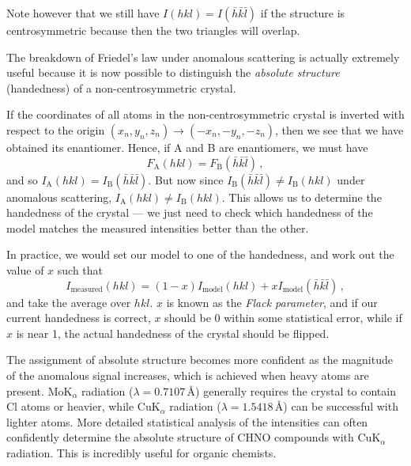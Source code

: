 \documentclass{article}
\theoremstyle{plain}\theoremheaderfont{\normalfont\itshape}\theorembodyfont{\rmfamily}\theoremseparator{.}\newtheorem*{rem}{Remark}\newtheorem*{ex}{Example}\newtheorem*{proof}{Proof}\newtheorem*{altp}{Alternative proof}
\theoremstyle{plain}\theoremheaderfont{\normalfont\bfseries}\theorembodyfont{\rmfamily}\theoremseparator{.}\newtheorem{thm}{Theorem}[section]\newtheorem{lem}[thm]{Lemma}\newtheorem{prop}[thm]{Proposition}\newtheorem*{cor}{Corollary}\newtheorem{defn}[thm]{Definition}\newtheorem{clm}[thm]{Claim}\newtheorem{clminproof}{Claim}\newtheorem*{law}{Law}\newtheorem{pos}[thm]{Postulate}
\theoremstyle{break}\theoremheaderfont{\normalfont\itshape}\theorembodyfont{\rmfamily}\theoremseparator{.\medskip}\newtheorem*{proofskip}{Proof}\newtheorem*{exs}{Examples}\newtheorem*{rems}{Remarks}
\theoremstyle{break}\theoremheaderfont{\normalfont\bfseries}\theorembodyfont{\rmfamily}\theoremseparator{.\medskip}\newtheorem{lemskip}[thm]{Lemma}\newtheorem{defnskip}[thm]{Definition}\newtheorem{propskip}[thm]{Proposition}\newtheorem{thmskip}[thm]{Theorem}
\numberwithin{equation}{section}
\begin{document}
    Note however that we still have \(I(hkl)=I(\bar{h}\bar{k}\bar{l})\) if the structure is centrosymmetric because then the two triangles will overlap.

    The breakdown of Friedel's law under anomalous scattering is actually extremely useful because it is now possible to distinguish the \textit{absolute structure} (handedness) of a non-centrosymmetric crystal.

    If the coordinates of all atoms in the non-centrosymmetric crystal is inverted with respect to the origin \((x_n,y_n,z_n)\to(-x_n,-y_n,-z_n)\), then we see that we have obtained its enantiomer. Hence, if A and B are enantiomers, we must have
    \begin{equation}
        F_{\text{A}}(hkl)=F_{\text{B}}(\bar{h}\bar{k}\bar{l})\,,
    \end{equation}
    and so \(I_{\text{A}}(hkl)=I_{\text{B}}(\bar{h}\bar{k}\bar{l})\). But now since \(I_{\text{B}}(\bar{h}\bar{k}\bar{l})\ne I_{\text{B}}(hkl)\) under anomalous scattering, \(I_{\text{A}}(hkl)\ne I_{\text{B}}(hkl)\). This allows us to determine the handedness of the crystal --- we just need to check which handedness of the model matches the measured intensities better than the other.

    In practice, we would set our model to one of the handedness, and work out the value of \(x\) such that
    \begin{equation}
        I_{\text{measured}}(hkl)=(1-x)I_{\text{model}}(hkl)+xI_{\text{model}}(\bar{h}\bar{k}\bar{l})\,,
    \end{equation}
    and take the average over \(hkl\). \(x\) is known as the \textit{Flack parameter}, and if our current handedness is correct, \(x\) should be 0 within some statistical error, while if \(x\) is near 1, the actual handedness of the crystal should be flipped.

    The assignment of absolute structure becomes more confident as the magnitude of the anomalous signal increases, which is achieved when heavy atoms are present. \(\mathrm{MoK}_\alpha\) radiation (\(\lambda=0.7107\,\text{\AA}\)) generally requires the crystal to contain \(\mathrm{Cl}\) atoms or heavier, while \(\mathrm{CuK}_\alpha\) radiation (\(\lambda=1.5418\,\text{\AA}\)) can be successful with lighter atoms. More detailed statistical analysis of the intensities can often confidently determine the absolute structure of \(\mathrm{CHNO}\) compounds with \(\mathrm{CuK}_\alpha\) radiation. This is incredibly useful for organic chemists.
\end{document}
